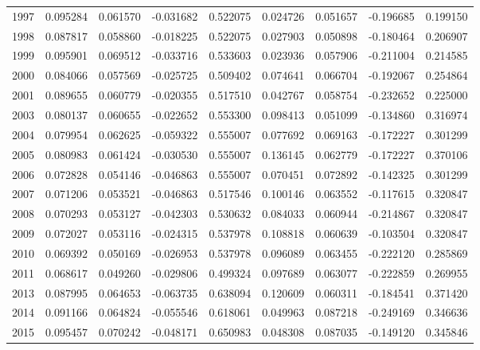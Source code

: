 \begin{table}[!ht]
\begin{tabularx}{\textwidth}{XXXXXXXXX}
    1997 &   0.095284 &     0.061570 & -0.031682 &  0.522075 &  0.024726 &    0.051657 & -0.196685 & 0.199150 \\
    1998 &   0.087817 &     0.058860 & -0.018225 &  0.522075 &  0.027903 &    0.050898 & -0.180464 & 0.206907 \\
    1999 &   0.095901 &     0.069512 & -0.033716 &  0.533603 &  0.023936 &    0.057906 & -0.211004 & 0.214585 \\
    2000 &   0.084066 &     0.057569 & -0.025725 &  0.509402 &  0.074641 &    0.066704 & -0.192067 & 0.254864 \\
    2001 &   0.089655 &     0.060779 & -0.020355 &  0.517510 &  0.042767 &    0.058754 & -0.232652 & 0.225000 \\
    2003 &   0.080137 &     0.060655 & -0.022652 &  0.553300 &  0.098413 &    0.051099 & -0.134860 & 0.316974 \\
    2004 &   0.079954 &     0.062625 & -0.059322 &  0.555007 &  0.077692 &    0.069163 & -0.172227 & 0.301299 \\
    2005 &   0.080983 &     0.061424 & -0.030530 &  0.555007 &  0.136145 &    0.062779 & -0.172227 & 0.370106 \\
    2006 &   0.072828 &     0.054146 & -0.046863 &  0.555007 &  0.070451 &    0.072892 & -0.142325 & 0.301299 \\
    2007 &   0.071206 &     0.053521 & -0.046863 &  0.517546 &  0.100146 &    0.063552 & -0.117615 & 0.320847 \\
    2008 &   0.070293 &     0.053127 & -0.042303 &  0.530632 &  0.084033 &    0.060944 & -0.214867 & 0.320847 \\
    2009 &   0.072027 &     0.053116 & -0.024315 &  0.537978 &  0.108818 &    0.060639 & -0.103504 & 0.320847 \\
    2010 &   0.069392 &     0.050169 & -0.026953 &  0.537978 &  0.096089 &    0.063455 & -0.222120 & 0.285869 \\
    2011 &   0.068617 &     0.049260 & -0.029806 &  0.499324 &  0.097689 &    0.063077 & -0.222859 & 0.269955 \\
    2013 &   0.087995 &     0.064653 & -0.063735 &  0.638094 &  0.120609 &    0.060311 & -0.184541 & 0.371420 \\
    2014 &   0.091166 &     0.064824 & -0.055546 &  0.618061 &  0.049963 &    0.087218 & -0.249169 & 0.346636 \\
    2015 &   0.095457 &     0.070242 & -0.048171 &  0.650983 &  0.048308 &    0.087035 & -0.149120 & 0.345846 \\

\end{tabularx}
\end{table}
